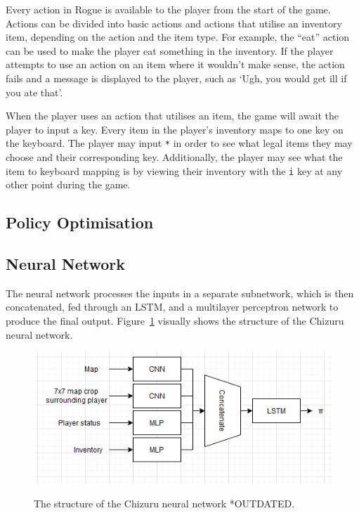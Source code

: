 \documentclass[12pt,a4paper]{article}
\begin{document}
    Every action in Rogue is available to the player from the start of the game.
    Actions can be divided into basic actions and actions that utilise an inventory item, depending on the action and the item type.
    For example,
    the ``eat'' action can be used to make the player eat something in the inventory.
    If the player attempts to use an action on an item where it wouldn't make sense, the action fails and a message is displayed to the player, such as `Ugh, you would get ill if you ate that'.

    When the player uses an action that utilises an item, the game will await the player to input a key.
    Every item in the player's inventory maps to one key on the keyboard.
    The player may input \texttt{*} in order to see what legal items they may choose and their corresponding key.
    Additionally, the player may see what the item to keyboard mapping is by viewing their inventory with the \texttt{i} key at any other point during the game.

    \subsection{Policy Optimisation}\label{subsec:policy-optimisation}

    \subsection{Neural Network}\label{subsec:neural-network}
    The neural network processes the inputs in a separate subnetwork, which is then concatenated, fed through an LSTM, and a multilayer perceptron network to produce the final output.
    Figure~\ref{fig:netwk} visually shows the structure of the Chizuru neural network.

    \begin{figure}[t]
        \caption{The structure of the Chizuru neural network *OUTDATED.} %
        \centering
        \includegraphics[scale=0.5]{network_structure}
        \label{fig:netwk}
    \end{figure}
\end{document}
